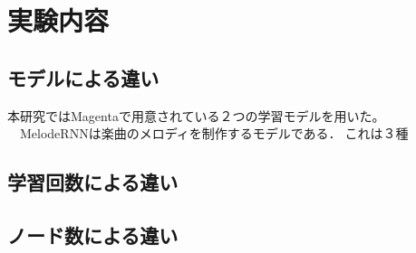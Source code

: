 \chapter{実験内容}
\section{モデルによる違い}
本研究ではMagentaで用意されている２つの学習モデルを用いた。
　MelodeRNNは楽曲のメロディを制作するモデルである．これは３種
\section{学習回数による違い}
\section{ノード数による違い}